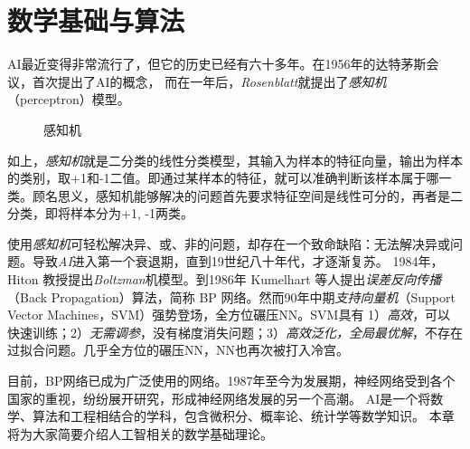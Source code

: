 \part{数学基础与算法}
\label{part:math_learning}

\newpage

\gls{AI}最近变得非常流行了，但它的历史已经有六十多年。在1956年的达特茅斯会议，首次提出了\gls{AI}的概念，
而在一年后，\emph{Rosenblatt}就提出了\emph{感知机}（perceptron）模型。


\begin{figure}[!htb]
\setcounter{TempEqCnt}{\value{chapter}}
\setcounter{chapter}{0} 
\centering
{}
\caption{感知机}
\label{fig:part2_math_perceptron}
\end{figure}
\setcounter{chapter}{\value{TempEqCnt}} 

如上，\emph{感知机}就是二分类的线性分类模型，其输入为样本的特征向量，输出为样本的类别，取+1和-1二值。即通过某样本的特征，就可以准确判断该样本属于哪一类。顾名思义，感知机能够解决的问题首先要求特征空间是线性可分的，再者是二分类，即将样本分为{+1, -1}两类。


使用\emph{感知机}可轻松解决异、或、非的问题，却存在一个致命缺陷：无法解决异或问题。导致\emph{AI}进入第一个衰退期，直到19世纪八十年代，才逐渐复苏。
1984年，Hiton 教授提出\emph{Boltzman}机模型。到1986年 Kumelhart 等人提出\emph{误差反向传播}（Back Propagation）算法，简称 BP 网络。然而90年中期\emph{支持向量机}（Support Vector Machines，SVM）强势登场，全方位碾压NN。SVM具有 1）\emph{高效}，可以快速训练；2）\emph{无需调参}，没有梯度消失问题；3）\emph{高效泛化，全局最优解}，不存在过拟合问题。几乎全方位的碾压NN，NN也再次被打入冷宫。


目前，BP网络已成为广泛使用的网络。1987年至今为发展期，神经网络受到各个国家的重视，纷纷展开研究，形成神经网络发展的另一个高潮。
\gls{AI}是一个将数学、算法和工程相结合的学科，包含微积分、概率论、统计学等数学知识。
本章将为大家简要介绍人工智相关的数学基础理论。


% 














